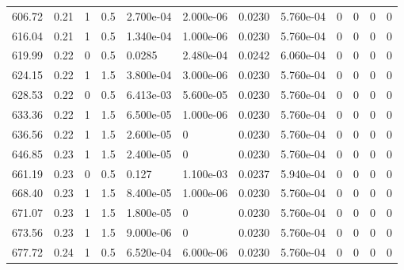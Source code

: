 \documentclass[preview]{standalone}
\begin{document}
{{{{\begin{tabular}{L{1.2cm}C{1.2cm} C{0.3cm}C{0.5cm} C{1.4cm}C{1.4cm} C{1.4cm}C{1.4cm} C{1.6cm}C{1.6cm} C{1.6cm}C{1.6cm}}
  606.72  &  0.21  & 1     & 0.5 &  2.700e-04  & 2.000e-06  &  0.0230&   5.760e-04& 0 & 0   &  0 & 0  \\ 
  616.04  &  0.21  & 1     & 0.5 &  1.340e-04  & 1.000e-06  &  0.0230&   5.760e-04& 0 & 0   &  0 & 0  \\ 
  619.99  &  0.22  & 0     & 0.5 &  0.0285  & 2.480e-04  &  0.0242&   6.060e-04& 0 & 0   &  0 & 0  \\ 
  624.15  &  0.22  & 1     & 1.5 &  3.800e-04  & 3.000e-06  &  0.0230&   5.760e-04& 0 & 0   &  0 & 0  \\ 
  628.53  &  0.22  & 0     & 0.5 &  6.413e-03  & 5.600e-05  &  0.0230&   5.760e-04& 0 & 0   &  0 & 0  \\ 
  633.36  &  0.22  & 1     & 1.5 &  6.500e-05  & 1.000e-06  &  0.0230&   5.760e-04& 0 & 0   &  0 & 0  \\ 
  636.56  &  0.22  & 1     & 1.5 &  2.600e-05  & 0  &  0.0230&   5.760e-04& 0 & 0   &  0 & 0  \\ 
  646.85  &  0.23  & 1     & 1.5 &  2.400e-05  & 0  &  0.0230&   5.760e-04& 0 & 0   &  0 & 0  \\ 
  661.19  &  0.23  & 0     & 0.5 &  0.127  & 1.100e-03  &  0.0237&   5.940e-04& 0 & 0   &  0 & 0  \\ 
  668.40  &  0.23  & 1     & 1.5 &  8.400e-05  & 1.000e-06  &  0.0230&   5.760e-04& 0 & 0   &  0 & 0  \\ 
  671.07  &  0.23  & 1     & 1.5 &  1.800e-05  & 0  &  0.0230&   5.760e-04& 0 & 0   &  0 & 0  \\ 
  673.56  &  0.23  & 1     & 1.5 &  9.000e-06  & 0  &  0.0230&   5.760e-04& 0 & 0   &  0 & 0  \\ 
  677.72  &  0.24  & 1     & 0.5 &  6.520e-04  & 6.000e-06  &  0.0230&   5.760e-04& 0 & 0   &  0 & 0  \\ 
\hline 
\end{tabular} 

}}}}
\end{document}
